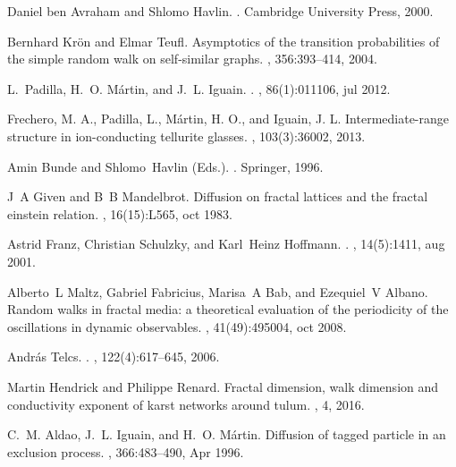 \documentclass[12pt]{iopart}
\begin{document}
\begin{thebibliography}{10}
Daniel ben Avraham and Shlomo Havlin.
.
\newblock Cambridge University Press, 2000.

Bernhard Kr\"on and Elmar Teufl.
\newblock Asymptotics of the transition probabilities of the simple random walk
  on self-similar graphs.
, 356:393--414, 2004.

L.~Padilla, H.~O. M{\'{a}}rtin, and J.~L. Iguain.
.
, 86(1):011106, jul 2012.

{Frechero, M. A.}, {Padilla, L.}, {Mártin, H. O.}, and {Iguain, J. L.}
\newblock Intermediate-range structure in ion-conducting tellurite glasses.
, 103(3):36002, 2013.

Amin Bunde and Shlomo~Havlin (Eds.).
.
\newblock Springer, 1996.

J~A Given and B~B Mandelbrot.
\newblock Diffusion on fractal lattices and the fractal einstein relation.
, 16(15):L565,
  oct 1983.

Astrid Franz, Christian Schulzky, and Karl~Heinz Hoffmann.
.
, 14(5):1411, aug 2001.

Alberto~L Maltz, Gabriel Fabricius, Marisa~A Bab, and Ezequiel~V Albano.
\newblock Random walks in fractal media: a theoretical evaluation of the
  periodicity of the oscillations in dynamic observables.
,
  41(49):495004, oct 2008.

Andr\'as Telcs.
.
, 122(4):617--645, 2006.

Martin Hendrick and Philippe Renard.
\newblock Fractal dimension, walk dimension and conductivity exponent of karst
  networks around tulum.
, 4, 2016.

C.~M. Aldao, J.~L. Iguain, and H.~O. M\'artin.
\newblock Diffusion of tagged particle in an exclusion process.
, 366:483--490, Apr 1996.

\end{thebibliography}
\end{document}
